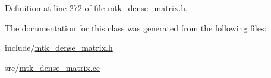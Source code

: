 Definition at line \hyperlink{mtk__dense__matrix_8h_source_l00272}{272} of file \hyperlink{mtk__dense__matrix_8h_source}{mtk\-\_\-dense\-\_\-matrix.\-h}.



The documentation for this class was generated from the following files\-:\begin{DoxyCompactItemize}
\item 
include/\hyperlink{mtk__dense__matrix_8h}{mtk\-\_\-dense\-\_\-matrix.\-h}\item 
src/\hyperlink{mtk__dense__matrix_8cc}{mtk\-\_\-dense\-\_\-matrix.\-cc}\end{DoxyCompactItemize}
